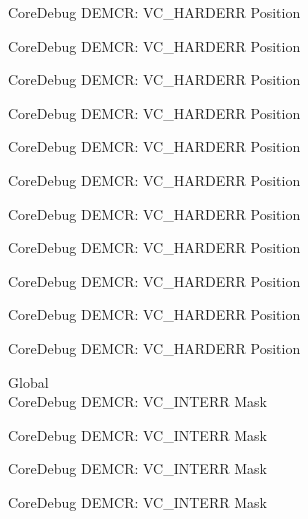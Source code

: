 \begin{DoxyRefList}
\label{deprecated__deprecated000417}%
%
Core\+Debug DEMCR\+: VC\+\_\+\+HARDERR Position 

\label{deprecated__deprecated000506}%
%
Core\+Debug DEMCR\+: VC\+\_\+\+HARDERR Position 

\label{deprecated__deprecated000608}%
%
Core\+Debug DEMCR\+: VC\+\_\+\+HARDERR Position 

\label{deprecated__deprecated000733}%
%
Core\+Debug DEMCR\+: VC\+\_\+\+HARDERR Position 

\label{deprecated__deprecated000813}%
%
Core\+Debug DEMCR\+: VC\+\_\+\+HARDERR Position 

\label{deprecated__deprecated000877}%
%
Core\+Debug DEMCR\+: VC\+\_\+\+HARDERR Position 

\label{deprecated__deprecated000952}%
%
Core\+Debug DEMCR\+: VC\+\_\+\+HARDERR Position 

\label{deprecated__deprecated001019}%
%
Core\+Debug DEMCR\+: VC\+\_\+\+HARDERR Position 

\label{deprecated__deprecated001095}%
%
Core\+Debug DEMCR\+: VC\+\_\+\+HARDERR Position 

\label{deprecated__deprecated001184}%
%
Core\+Debug DEMCR\+: VC\+\_\+\+HARDERR Position 

\label{deprecated__deprecated001286}%
%
Core\+Debug DEMCR\+: VC\+\_\+\+HARDERR Position  
\item[Global \doxylink{group___c_m_s_i_s___core_debug_gad6815d8e3df302d2f0ff2c2c734ed29a}{Core\+Debug\+\_\+\+DEMCR\+\_\+\+VC\+\_\+\+INTERR\+\_\+\+Msk} ]\hfill \\
\label{deprecated__deprecated000058}%
%
Core\+Debug DEMCR\+: VC\+\_\+\+INTERR Mask 

\label{deprecated__deprecated000202}%
%
Core\+Debug DEMCR\+: VC\+\_\+\+INTERR Mask 

\label{deprecated__deprecated000344}%
%
Core\+Debug DEMCR\+: VC\+\_\+\+INTERR Mask 

\label{deprecated__deprecated000420}%
%
Core\+Debug DEMCR\+: VC\+\_\+\+INTERR Mask 


\end{DoxyRefList}
